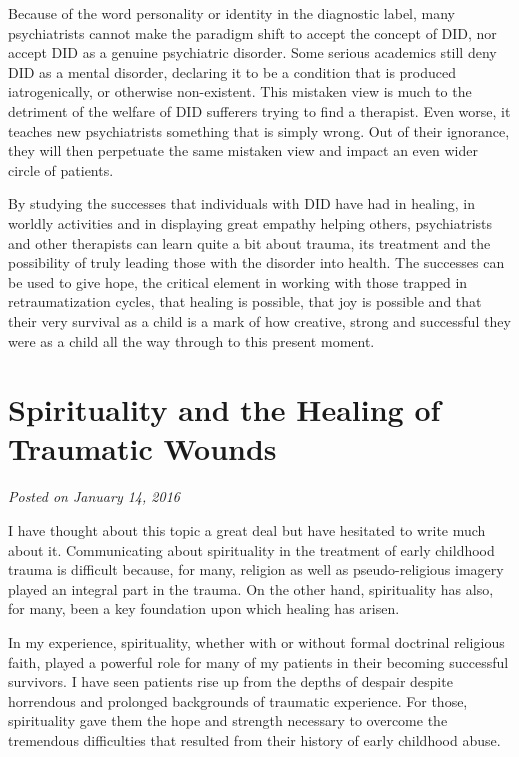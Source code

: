 \documentclass[]{book}
\begin{document}
Because of the word personality or identity in the diagnostic label, many psychiatrists cannot make the paradigm shift to accept the concept of DID, nor accept DID as a genuine psychiatric disorder. Some serious academics still deny DID as a mental disorder, declaring it to be a condition that is produced iatrogenically, or otherwise non-existent. This mistaken view is much to the detriment of the welfare of DID sufferers trying to find a therapist. Even worse, it teaches new psychiatrists something that is simply wrong. Out of their ignorance, they will then perpetuate the same mistaken view and impact an even wider circle of patients.

By studying the successes that individuals with DID have had in healing, in worldly activities and in displaying great empathy helping others, psychiatrists and other therapists can learn quite a bit about trauma, its treatment and the possibility of truly leading those with the disorder into health. The successes can be used to give hope, the critical element in working with those trapped in retraumatization cycles, that healing is possible, that joy is possible and that their very survival as a child is a mark of how creative, strong and successful they were as a child all the way through to this present moment.

\hypertarget{spirituality-and-the-healing-of-traumatic-wounds}{%
\section{Spirituality and the Healing of Traumatic Wounds}\label{spirituality-and-the-healing-of-traumatic-wounds}}

\emph{Posted on January 14, 2016}

I have thought about this topic a great deal but have hesitated to write much about it. Communicating about spirituality in the treatment of early childhood trauma is difficult because, for many, religion as well as pseudo-religious imagery played an integral part in the trauma. On the other hand, spirituality has also, for many, been a key foundation upon which healing has arisen.

In my experience, spirituality, whether with or without formal doctrinal religious faith, played a powerful role for many of my patients in their becoming successful survivors. I have seen patients rise up from the depths of despair despite horrendous and prolonged backgrounds of traumatic experience. For those, spirituality gave them the hope and strength necessary to overcome the tremendous difficulties that resulted from their history of early childhood abuse.
\end{document}
